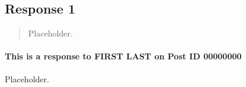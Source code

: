 
\subsection{Response 1}
  \begin{quotation}
    Placeholder.
  \end{quotation}

  \paragraph{This is a response to FIRST LAST on Post ID 00000000}
    Placeholder.
